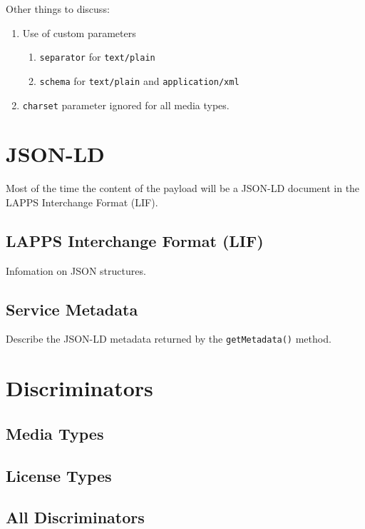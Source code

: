 \documentclass{article}
\newcommand{\lapps}{LAPPS\xspace}
\renewcommand{\tt}[1]{\texttt{#1}}
\newenvironment{enum}{
\begin{enumerate}
  \setlength{\itemsep}{1pt}
  \setlength{\parskip}{0pt}
  \setlength{\parsep}{0pt}
}{\end{enumerate}}
\begin{document}
Other things to discuss:
\begin{enum}
	\item Use of custom parameters
	\begin{enum}
		\item \tt{separator} for \tt{text/plain}
		\item \tt{schema} for \tt{text/plain} and \tt{application/xml}
	\end{enum}
	\item \tt{charset} parameter ignored for all media types.
\end{enum}


\section{JSON-LD}\label{sec:json-ld}

Most of the time the content of the payload will be a JSON-LD document in the LAPPS Interchange Format (LIF).
\subsection{\lapps Interchange Format (LIF)}\label{sec:lif}

Infomation on JSON structures.

\subsection{Service Metadata}\label{sec:metadata}

Describe the JSON-LD metadata returned by the \tt{getMetadata()} method.


\section{Discriminators}\label{sec:discriminators}

\subsection{Media Types}


\subsection{License Types}\label{sub:licenses}


\subsection{All Discriminators}\label{sub:discriminators}





\end{document}
